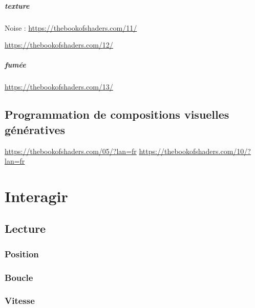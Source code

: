 \documentclass[
  french,
]{book}
\begin{document}
\hypertarget{texture-1}{%
\paragraph{texture}\label{texture-1}}

Noise : \url{https://thebookofshaders.com/11/}

\url{https://thebookofshaders.com/12/}

\hypertarget{fumuxe9e}{%
\paragraph{fumée}\label{fumuxe9e}}

\url{https://thebookofshaders.com/13/}

\hypertarget{programmation-de-compositions-visuelles-guxe9nuxe9ratives}{%
\section{Programmation de compositions visuelles génératives}\label{programmation-de-compositions-visuelles-guxe9nuxe9ratives}}

\url{https://thebookofshaders.com/05/?lan=fr}
\url{https://thebookofshaders.com/10/?lan=fr}

\hypertarget{interagir}{%
\chapter{Interagir}\label{interagir}}

\hypertarget{lecture}{%
\section{Lecture}\label{lecture}}

\hypertarget{position-1}{%
\subsection{Position}\label{position-1}}

\hypertarget{boucle}{%
\subsection{Boucle}\label{boucle}}

\hypertarget{vitesse}{%
\subsection{Vitesse}\label{vitesse}}
\end{document}
